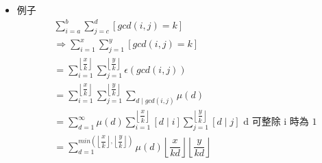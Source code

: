 \begin{itemize}
\item 例子
$$ \begin{aligned}
    &\sum_{i = a}^{b} \sum_{j = c}^{d} [gcd(i, j) = k]\\
    &\Rightarrow \sum_{i = 1}^{x} \sum_{j = 1}^{y} [gcd(i, j) = k]\\
    &= \sum_{i = 1}^{\left\lfloor\dfrac {x}{k} \right\rfloor} \sum_{j = 1}^{\left\lfloor\dfrac {y}{k} \right\rfloor} \epsilon(gcd(i, j))\\
    &= \sum_{i = 1}^{\left\lfloor\dfrac {x}{k} \right\rfloor} \sum_{j = 1}^{\left\lfloor\dfrac {y}{k} \right\rfloor} \sum_{d \mid gcd(i, j)} \mu(d)\\
    &= \sum_{d = 1}^{\infty} \mu(d) \sum_{i = 1}^{\left\lfloor\dfrac {x}{k} \right\rfloor} [d \mid i] \sum_{j = 1}^{\left\lfloor\dfrac {y}{k} \right\rfloor} [d \mid j] \text{\ \ d 可整除 i 時為 1}\\
    &= \sum_{d = 1}^{min(\left\lfloor\dfrac {x}{k} \right\rfloor, \left\lfloor\dfrac {y}{k} \right\rfloor)} \mu(d) \left\lfloor\dfrac {x}{kd} \right\rfloor \left\lfloor\dfrac {y}{kd} \right\rfloor
\end{aligned} $$
\end{itemize}